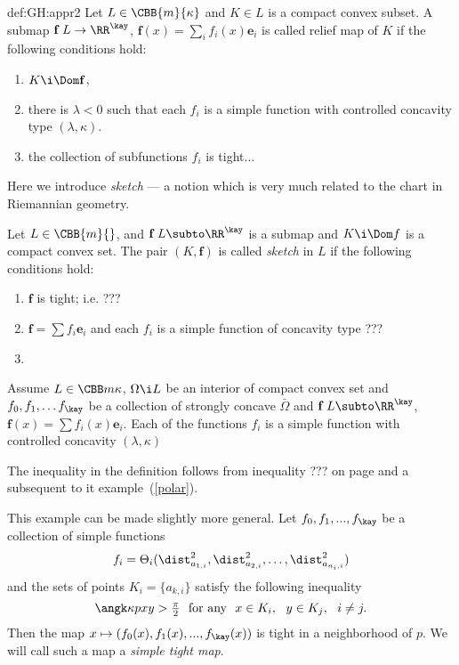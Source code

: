 {\begin{subthm}{def:GH:appr2}
Let $L\in\CBB{m}{\kappa}$ and $K\in L$ is a compact convex subset.
A submap $\mathbf f\:L\to\RR^{\kay}$, $\mathbf f(x)=\sum_i f_i(x)\mathbf e_i$
is called relief map of $K$ if the following conditions hold:
\begin{enumerate}
\item $K\i \Dom \mathbf f$,
\item there is $\lambda<0$ such that each $f_i$ is a simple function with controlled concavity type $(\lambda,\kappa)$.
\item the collection of subfunctions $f_i$ is tight...
\end{enumerate}



 Here we introduce \emph{sketch} --- a notion which is very much related to the chart in Riemannian geometry.

Let $L\in\CBB{m}{}$, and $\mathbf f\: L\subto\RR^\kay$ is a submap and $K\i \Dom f$ is a compact convex set.
The pair $(K, \mathbf f)$ is called \emph{sketch} in $L$ if the following conditions hold:

\begin{enumerate}
\item $\mathbf f$ is tight; i.e. ???
\item $\mathbf f=\sum f_i\mathbf e_i$ and each $f_i$ is a simple function of concavity type ???
\item 
\end{enumerate}


Assume $L\in \CBB m\kappa$, $\Omega\i L$ be an interior of compact convex set and $f_0,f_1,\dots f_\kay$ be a collection of strongly concave $\bar\Omega$ and $\mathbf f\:L\subto \RR^\kay$, $\mathbf f(x)=\sum f_i(x)\mathbf e_i$.
Each of the functions $f_i$ is a simple function with controlled concavity $(\lambda,\kappa)$



















The inequality in the definition follows from inequality ???
on page \pageref{**-polar-inq} and a subsequent to it example~(\ref{polar}).

This example can be made slightly more general.
Let $f_0,f_1,...,f_\kay$ be a collection of simple functions
$$f_i=\Theta_i(\dist_{a_{1,i}}^2,\dist_{a_{2,i}}^2,\dots, \dist_{a_{n_i,i}}^2)$$
and the sets of points $K_i=\{a_{k,i}\}$ satisfy the following inequality
$$\angk\kappa p x y>\tfrac\pi2\ \ \text{for any}\ \  x\in K_i,\ \  y\in K_j,\ \ i\not=j.$$
Then the map
$x\mapsto(f_0(x),f_1(x),...,f_\kay(x))$
is tight in a neighborhood of $p$.
 We will call such a map a \emph{simple tight map}.


\end{subthm}}
